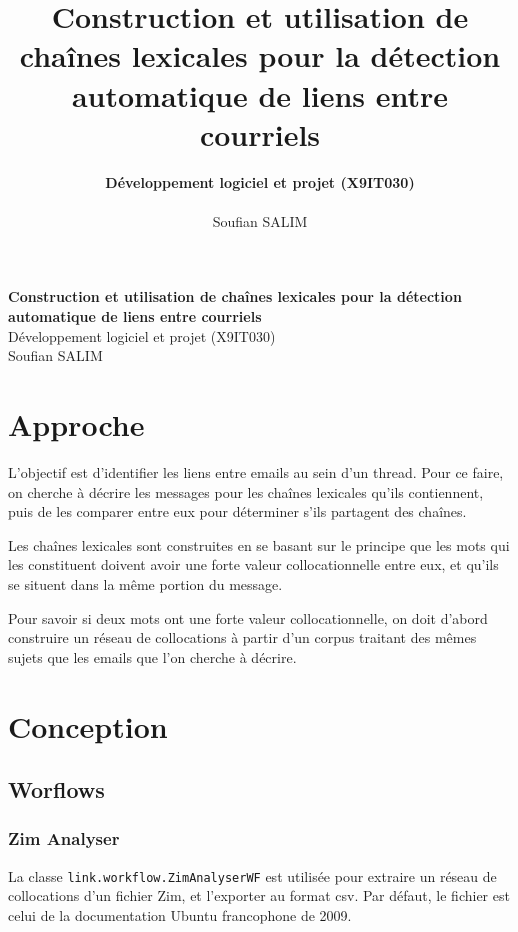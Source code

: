 \documentclass[a4paper]{article}
\title{\bf Construction et utilisation de chaînes lexicales pour la détection automatique de liens entre courriels}
\author{
    \textbf{Développement logiciel et projet (X9IT030)} \\
    \\
    Soufian SALIM
}
\begin{document}
\begin{titlepage}
	\vspace*{\fill}
	
	\begin{center}
		{\Large \bf Construction et utilisation de chaînes lexicales pour la détection automatique de liens entre courriels}\\[0.8cm]
		{\Large Développement logiciel et projet (X9IT030)}\\[0.8cm]
		{Soufian SALIM}\\[0.8cm]
	\end{center}
	
	\vspace*{\fill}
\end{titlepage}

\newpage

\section{Approche}

L'objectif est d'identifier les liens entre emails au sein d'un thread. Pour ce faire, on cherche à décrire les messages pour les chaînes lexicales qu'ils contiennent, puis de les comparer entre eux pour déterminer s'ils partagent des chaînes.

Les chaînes lexicales sont construites en se basant sur le principe que les mots qui les constituent doivent avoir une forte valeur collocationnelle entre eux, et qu'ils se situent dans la même portion du message.

Pour savoir si deux mots ont une forte valeur collocationnelle, on doit d'abord construire un réseau de collocations à partir d'un corpus traitant des mêmes sujets que les emails que l'on cherche à décrire.

\section{Conception}

\subsection{Worflows}

\subsubsection{Zim Analyser}

La classe \texttt{link.workflow.ZimAnalyserWF} est utilisée pour extraire un réseau de collocations d'un fichier Zim, et l'exporter au format csv. Par défaut, le fichier est celui de la documentation Ubuntu francophone de 2009.
\end{document}

